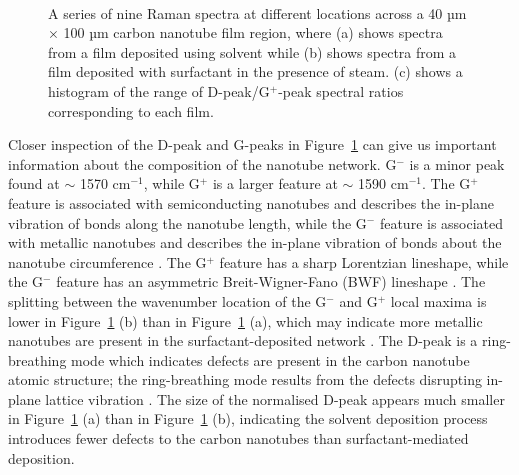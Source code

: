 \documentclass[
  a4paper,
]{scrbook}
\begin{document}
\begin{figure}
\begin{minipage}[t]{0.72\linewidth}
{{}

}

\end{minipage}%
%
\begin{minipage}[t]{0.14\linewidth}

{\centering 

~

}

\end{minipage}%

\caption{\label{fig-pristine-raman}A series of nine Raman spectra at
different locations across a 40 µm \(\times\) 100 µm carbon nanotube
film region, where (a) shows spectra from a film deposited using solvent
while (b) shows spectra from a film deposited with surfactant in the
presence of steam. (c) shows a histogram of the range of
D-peak/G\(^+\)-peak spectral ratios corresponding to each film.}

\end{figure}

Closer inspection of the D-peak and G-peaks in
Figure~\ref{fig-pristine-raman} can give us important information about
the composition of the nanotube network. G\(^-\) is a minor peak found
at \(\sim\) 1570 cm\(^{-1}\), while G\(^+\) is a larger feature at
\(\sim\) 1590 cm\(^{-1}\). The G\(^+\) feature is associated with
semiconducting nanotubes and describes the in-plane vibration of bonds
along the nanotube length, while the G\(^-\) feature is associated with
metallic nanotubes and describes the in-plane vibration of bonds about
the nanotube circumference \autocite{King2014,Swiniarski2021}. The
G\(^+\) feature has a sharp Lorentzian lineshape, while the G\(^-\)
feature has an asymmetric Breit-Wigner-Fano (BWF) lineshape
\autocite{Blackburn2006,Swiniarski2021}. The splitting between the
wavenumber location of the G\(^-\) and G\(^+\) local maxima is lower in
Figure~\ref{fig-pristine-raman} (b) than in
Figure~\ref{fig-pristine-raman} (a), which may indicate more metallic
nanotubes are present in the surfactant-deposited network
\autocite{Swiniarski2021}. The D-peak is a ring-breathing mode which
indicates defects are present in the carbon nanotube atomic structure;
the ring-breathing mode results from the defects disrupting in-plane
lattice vibration
\autocite{King2014,CuentasGallegos2011,Swiniarski2021}. The size of the
normalised D-peak appears much smaller in
Figure~\ref{fig-pristine-raman} (a) than in
Figure~\ref{fig-pristine-raman} (b), indicating the solvent deposition
process introduces fewer defects to the carbon nanotubes than
surfactant-mediated deposition.
\end{document}
